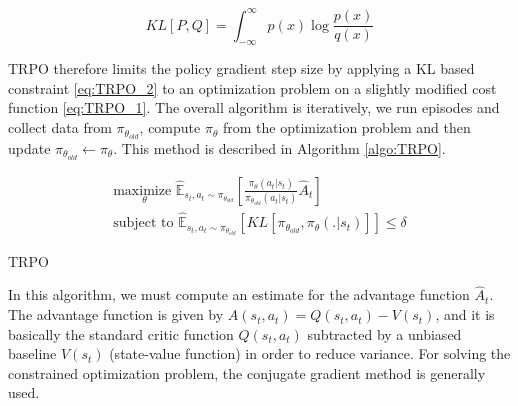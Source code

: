 
\begin{equation}
KL[P,Q] = \int_{-\infty}^{\infty}{p(x)\log{\frac{p(x)}{q(x)}}}
\label{eq:KL_divergence}
\end{equation}

TRPO therefore limits the policy gradient step size by applying a KL based constraint \eqref{eq:TRPO_2} to an optimization problem on a slightly modified cost function \eqref{eq:TRPO_1}. The overall algorithm is iteratively, we run episodes and collect data from $\pi_{\theta_{old}}$, compute $\pi_{\theta}$ from the optimization problem and then update $\pi_{\theta_{old}} \leftarrow \pi_{\theta}$. This method is described in Algorithm \ref{algo:TRPO}.


\begin{align}
\underset{\theta}{\textrm{maximize }} \mathbb{\hat{E}}_{s_t,a_t \sim \pi_{\theta_{old}} } \left[ \frac{\pi_{\theta}(a_t|s_t)}{
\pi_{\theta_{old}}(a_t|s_t)}\hat{A}_t \right]
\label{eq:TRPO_1}
\\
\textrm{subject to } \mathbb{\hat{E}}_{s_t,a_t \sim \pi_{\theta_{old}} } \left[ KL[\pi_{\theta_{old}},\pi_{\theta}(.|s_t)] \right] \leq \delta
\label{eq:TRPO_2}
\end{align}

\begin{algorithm}[H]
    \DontPrintSemicolon
    \SetAlgoLined
    \Return{$\pi_{\theta}$}
    \caption{TRPO}
    \label{algo:TRPO}
\end{algorithm}

In this algorithm, we must compute an estimate for the advantage function $\hat{A}_t$. The advantage function is given by $A(s_t,a_t) = Q(s_t,a_t) - V(s_t)$, and it is basically the standard critic function $Q(s_t,a_t)$ subtracted by a unbiased baseline $V(s_t)$ (state-value function) in order to reduce variance. For solving the constrained optimization problem, the conjugate gradient method is generally used.

